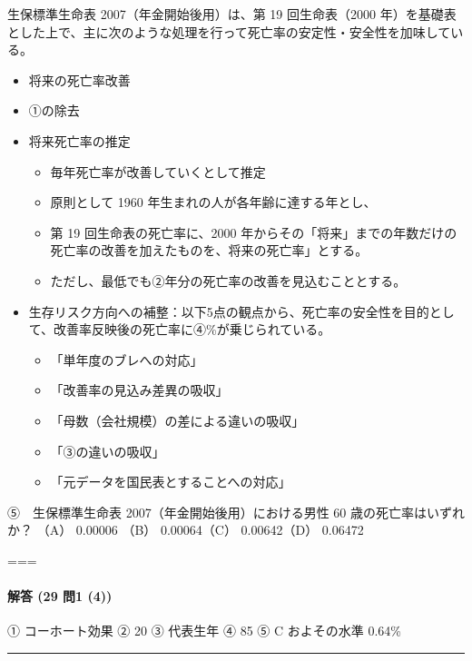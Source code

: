 \documentclass[
]{article}
\providecommand{\tightlist}{%
  \setlength{\itemsep}{0pt}\setlength{\parskip}{0pt}}
\begin{document}
生保標準生命表 2007（年金開始後用）は、第 19 回生命表（2000
年）を基礎表とした上で、主に次のような処理を行って死亡率の安定性・安全性を加味している。

\begin{itemize}
\tightlist
\item
  将来の死亡率改善
\item
  ①の除去
\item
  将来死亡率の推定

  \begin{itemize}
  \tightlist
  \item
    毎年死亡率が改善していくとして推定
  \item
    原則として 1960 年生まれの人が各年齢に達する年とし、
  \item
    第 19 回生命表の死亡率に、2000
    年からその「将来」までの年数だけの死亡率の改善を加えたものを、将来の死亡率」とする。
  \item
    ただし、最低でも②年分の死亡率の改善を見込むこととする。
  \end{itemize}
\item
  生存リスク方向への補整：以下5点の観点から、死亡率の安全性を目的として、改善率反映後の死亡率に④\%が乗じられている。

  \begin{itemize}
  \tightlist
  \item
    「単年度のブレへの対応」
  \item
    「改善率の見込み差異の吸収」
  \item
    「母数（会社規模）の差による違いの吸収」
  \item
    「③の違いの吸収」
  \item
    「元データを国民表とすることへの対応」
  \end{itemize}
\end{itemize}

⑤　生保標準生命表 2007（年金開始後用）における男性 60
歳の死亡率はいずれか？ （A） 0.00006 （B） 0.00064（C） 0.00642（D）
0.06472

===

\hypertarget{ux89e3ux7b54-29-ux554f1-4}{%
\paragraph{解答 (29 問1 (4))}\label{ux89e3ux7b54-29-ux554f1-4}}

① コーホート効果 ② 20 ③ 代表生年 ④ 85 ⑤ C およその水準 0.64\%

\begin{center}\rule{0.5\linewidth}{0.5pt}\end{center}
\end{document}
